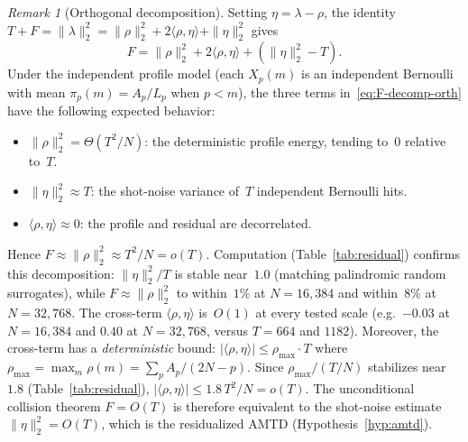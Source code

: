 \documentclass[11pt]{article}
\theoremstyle{definition}
\theoremstyle{remark}
\newtheorem{remark}[theorem]{Remark}
\begin{document}
\begin{remark}[Orthogonal decomposition]\label{rem:orthogonal}
Setting $\eta = \lambda - \rho$,
the identity
$T + F = \|\lambda\|_2^2
= \|\rho\|_2^2 + 2\langle \rho, \eta \rangle
  + \|\eta\|_2^2$
gives
\begin{equation}\label{eq:F-decomp-orth}
  F = \|\rho\|_2^2
      + 2\langle \rho, \eta \rangle
      + (\|\eta\|_2^2 - T).
\end{equation}
Under the independent profile model
(each $X_p(m)$ is an independent
Bernoulli with mean $\pi_p(m) = A_p/L_p$
when $p < m$), the three terms
in~\eqref{eq:F-decomp-orth} have the
following expected behavior:
\begin{itemize}
\item $\|\rho\|_2^2 = \Theta(T^2/N)$:
the deterministic profile energy,
tending to~$0$ relative to~$T$.
\item $\|\eta\|_2^2 \approx T$:
the shot-noise variance of~$T$
independent Bernoulli hits.
\item $\langle \rho, \eta \rangle \approx 0$:
the profile and residual are decorrelated.
\end{itemize}
Hence $F \approx \|\rho\|_2^2
\approx T^2/N = o(T)$.
Computation (Table~\ref{tab:residual})
confirms this decomposition:
$\|\eta\|_2^2/T$ is stable near~$1.0$
(matching palindromic random surrogates),
while $F \approx \|\rho\|_2^2$
to within~$1\%$ at $N = 16{,}384$
and within~$8\%$ at $N = 32{,}768$.
The cross-term $\langle \rho, \eta \rangle$
is~$O(1)$ at every tested scale
(e.g.\ $-0.03$ at $N = 16{,}384$
and $0.40$ at $N = 32{,}768$,
versus $T = 664$ and $1182$).
Moreover, the cross-term has a
\emph{deterministic} bound:
$|\langle \rho, \eta \rangle|
\le \rho_{\max} \cdot T$
where $\rho_{\max} = \max_{m} \rho(m)
= \sum_p A_p/(2N{-}p)$.
Since $\rho_{\max}/(T/N)$ stabilizes
near~$1.8$ (Table~\ref{tab:residual}),
$|\langle \rho, \eta \rangle|
\le 1.8\,T^2/N = o(T)$.
The unconditional collision theorem
$F = O(T)$ is therefore equivalent to
the shot-noise estimate
$\|\eta\|_2^2 = O(T)$,
which is the residualized AMTD
(Hypothesis~\ref{hyp:amtd}).
\end{remark}
\end{document}
